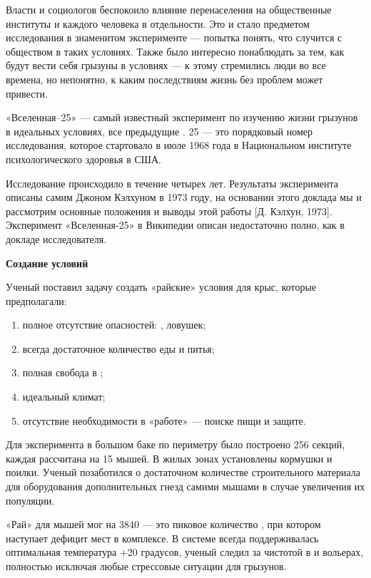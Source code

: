 Власти и социологов беспокоило влияние перенаселения на общественные институты и каждого человека в отдельности. Это и стало предметом исследования в знаменитом эксперименте --- попытка понять, что случится с обществом в таких условиях. Также было интересно понаблюдать за тем, как будут вести себя грызуны в условиях  --- к этому стремились люди во все времена, но непонятно, к каким последствиям  жизнь без проблем может привести.

«Вселенная–25» --- самый известный эксперимент по изучению жизни грызунов в идеальных условиях, все предыдущие . 25 --- это порядковый номер исследования, которое стартовало в июле 1968 года в Национальном институте психологического здоровья в США.

Исследование происходило в течение четырех лет. Результаты эксперимента описаны самим Джоном Кэлхуном в 1973 году, на основании этого доклада мы и рассмотрим основные положения и выводы этой работы [Д.  Кэлхун, 1973]. Эксперимент «Вселенная-25» в Википедии описан недостаточно полно, как в докладе исследователя.

\textbf{Создание условий}

Ученый поставил задачу создать «райские» условия для крыс, которые предполагали:
\begin{enumerate}
    \item полное отсутствие опасностей: , ловушек;
    \item всегда достаточное количество еды и питья;
    \item полная свобода в ;
    \item идеальный климат;
    \item отсутствие необходимости в «работе» --- поиске пищи и защите.
\end{enumerate}

Для эксперимента в большом баке по периметру было построено 256 секций, каждая рассчитана на 15 мышей. В жилых зонах установлены кормушки и поилки. Ученый позаботился о достаточном количестве строительного материала для оборудования дополнительных гнезд самими мышами в случае увеличения их популяции.

«Рай» для мышей мог  на 3840  --- это пиковое количество , при котором наступает дефицит мест в комплексе. В системе всегда поддерживалась оптимальная температура +20 градусов, ученый следил за чистотой в  и вольерах, полностью исключая любые стрессовые ситуации для грызунов.

